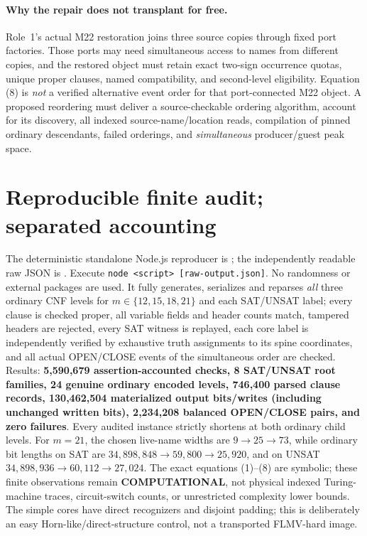 \documentclass[11pt]{article}
\begin{document}
\paragraph{Why the repair does not transplant for free.}
Role~1's actual M22 restoration joins three source
copies through fixed port factories.  Those
ports may need simultaneous access to names from
different copies, and the restored object must
retain exact two-sign occurrence quotas, unique
proper clauses, named compatibility, and
second-level eligibility.  Equation (8)
is \emph{not} a verified alternative event order for
that port-connected M22 object.
A proposed reordering must deliver a source-checkable
ordering algorithm, account for its discovery,
all indexed source-name/location reads, compilation
of pinned ordinary descendants, failed orderings,
and \emph{simultaneous} producer/guest peak space.

\section{Reproducible finite audit; separated accounting}
The deterministic standalone Node.js reproducer is
;
the independently readable raw JSON is
.
Execute \texttt{node <script> [raw-output.json]}.
No randomness or external packages are used.
It fully generates, serializes and reparses \emph{all}
three ordinary CNF levels for $m\in\{12,15,18,21\}$
and each SAT/UNSAT label; every clause is checked
proper, all variable fields and header counts match,
tampered headers are rejected, every SAT witness
is replayed, each core label is independently verified
by exhaustive truth assignments to its spine
coordinates, and all actual OPEN/CLOSE events of
the simultaneous order are checked.
Results: \textbf{5,590,679 assertion-accounted checks,
8 SAT/UNSAT root families, 24 genuine ordinary
encoded levels, 746,400 parsed clause records,
130,462,504 materialized output bits/writes
(including unchanged written bits),
2,234,208 balanced OPEN/CLOSE pairs, and zero failures}.
Every audited instance strictly shortens at both
ordinary child levels. For $m=21$, the chosen
live-name widths are $9\to25\to73$, while
ordinary bit lengths on SAT are
$34,898,848\to59,800\to25,920$, and on UNSAT
$34,898,936\to60,112\to27,024$.
The exact equations (1)--(8) are symbolic;
these finite observations remain
\textbf{COMPUTATIONAL}, not physical indexed
Turing-machine traces, circuit-switch counts,
or unrestricted complexity lower bounds.
The simple cores have direct recognizers
and disjoint padding; this is deliberately
an easy Horn-like/direct-structure control,
not a transported FLMV-hard image.
\end{document}
